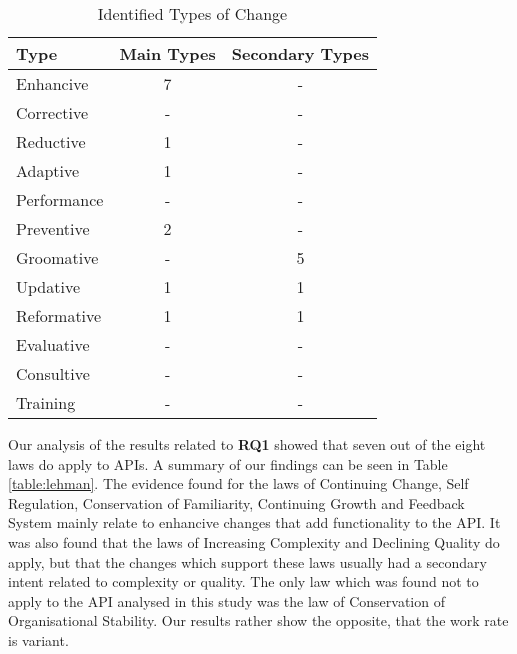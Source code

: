 \documentclass{sig-alternate}
\begin{document}
\begin{table}
       \centering
       \begin{tabular}[ht]{l|c|c}
              \toprule

              \textbf{Type}        & \textbf{Main Types}       &\textbf{Secondary Types}   \\ \midrule
              Enhancive            & 7                         & -                         \\ \hline
              Corrective           & -                         & -                         \\ \hline
              Reductive            & 1                         & -                         \\ \hline
              Adaptive             & 1                         & -                         \\ \hline
              Performance          & -                         & -                         \\ \hline
              Preventive           & 2                         & -                         \\ \hline
              Groomative           & -                         & 5                         \\ \hline
              Updative             & 1                         & 1                         \\ \hline
              Reformative          & 1                         & 1                         \\ \hline
              Evaluative           & -                         & -                         \\ \hline
              Consultive           & -                         & -                         \\ \hline
              Training             & -                         & -                         \\ 

              \bottomrule

       \end{tabular}
       \caption{Identified Types of Change}
       \label{table:type_counts}
\end{table}

Our analysis of the results related to \textbf{RQ1} showed that seven out of the eight laws \cite{lehman90sview} do apply to APIs. A summary of our findings can be seen in Table \ref{table:lehman}. The evidence found for the laws of Continuing Change, Self Regulation, Conservation of Familiarity, Continuing Growth and Feedback System mainly relate to enhancive changes that add functionality to the API. It was also found that the laws of Increasing Complexity and Declining Quality do apply, but that the changes which support these laws usually had a secondary intent related to complexity or quality. The only law which was found not to apply to the API analysed in this study was the law of Conservation of Organisational Stability. Our results rather show the opposite, that the work rate is variant. 
\end{document}

